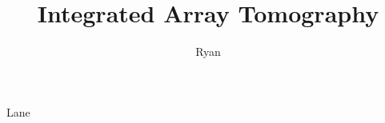 \documentclass{thesis}
\begin{document}
\newcommand{\needref}{[\textit{\textcolor{orange}{references}}]}


\title[Development and Applications of a Workflow for 3D Correlative Light and Electron Microscopy]{Integrated Array Tomography}
\author{Ryan}{Lane}


\frontmatter  %


\tableofcontents


\mainmatter  %


% 


\end{document}
